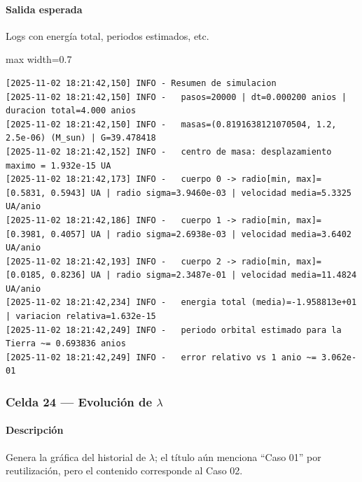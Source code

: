 \paragraph{Salida esperada} Logs con energía total, periodos estimados, etc.

\begin{listing}[H]
\caption{Ejemplo Salida}
\begin{adjustbox}{max width=0.7\textwidth}
\begin{minipage}{\textwidth}
\begin{verbatim}
[2025-11-02 18:21:42,150] INFO - Resumen de simulacion
[2025-11-02 18:21:42,150] INFO -   pasos=20000 | dt=0.000200 anios | duracion total=4.000 anios
[2025-11-02 18:21:42,150] INFO -   masas=(0.8191638121070504, 1.2, 2.5e-06) (M_sun) | G=39.478418
[2025-11-02 18:21:42,152] INFO -   centro de masa: desplazamiento maximo = 1.932e-15 UA
[2025-11-02 18:21:42,173] INFO -   cuerpo 0 -> radio[min, max]=[0.5831, 0.5943] UA | radio sigma=3.9460e-03 | velocidad media=5.3325 UA/anio
[2025-11-02 18:21:42,186] INFO -   cuerpo 1 -> radio[min, max]=[0.3981, 0.4057] UA | radio sigma=2.6938e-03 | velocidad media=3.6402 UA/anio
[2025-11-02 18:21:42,193] INFO -   cuerpo 2 -> radio[min, max]=[0.0185, 0.8236] UA | radio sigma=2.3487e-01 | velocidad media=11.4824 UA/anio
[2025-11-02 18:21:42,234] INFO -   energia total (media)=-1.958813e+01 | variacion relativa=1.632e-15
[2025-11-02 18:21:42,249] INFO -   periodo orbital estimado para la Tierra ~= 0.693836 anios
[2025-11-02 18:21:42,249] INFO -   error relativo vs 1 anio ~= 3.062e-01
\end{verbatim}
\end{minipage}
\end{adjustbox}
\end{listing}

\subsubsection*{Celda 24 — Evolución de $\lambda$}
\paragraph{Descripción} Genera la gráfica del historial de $\lambda$; el título aún menciona ``Caso 01'' por reutilización, pero el contenido corresponde al Caso 02.
